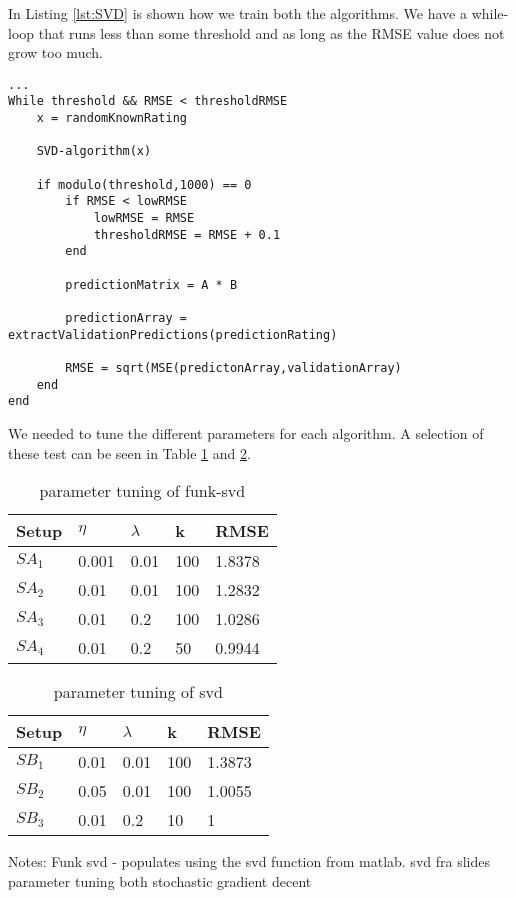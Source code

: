 In Listing \ref{lst:SVD} is shown how we train both the algorithms. We have a while-loop that runs less than some threshold and as long as the RMSE value does not grow too much.


\begin{lstlisting}[caption={Training of the prediction matrix},label=lst:SVD]
...
While threshold && RMSE < thresholdRMSE
	x = randomKnownRating
	
	SVD-algorithm(x)
	
	if modulo(threshold,1000) == 0
		if RMSE < lowRMSE 
			lowRMSE = RMSE 
			thresholdRMSE = RMSE + 0.1
		end
		
		predictionMatrix = A * B
		
		predictionArray = extractValidationPredictions(predictionRating)
		
		RMSE = sqrt(MSE(predictonArray,validationArray)	
	end
end
\end{lstlisting}

We needed to tune the different parameters for each algorithm. A selection of these test can be seen in Table \ref{fig:funk_tune} and \ref{fig:SVD_tune}.

\begin{table}[h]
\centering
\caption{parameter tuning of funk-svd}
\label{fig:funk_tune}
\begin{tabular}{|l|llll|}
\hline
Setup	& $\eta$ & $\lambda$ & k   & RMSE   \\ \hline
$SA_1$	& 0.001  & 0.01      & 100 & 1.8378 \\ \hline
$SA_2$	& 0.01   & 0.01      & 100 & 1.2832 \\ \hline
$SA_3$	& 0.01   & 0.2       & 100 & 1.0286 \\ \hline
$SA_4$	& 0.01   & 0.2		 & 50  & 0.9944 \\ \hline
\end{tabular}
\end{table}

\begin{table}[h]
\centering
\caption{parameter tuning of svd}
\label{fig:SVD_tune}
\begin{tabular}{|l|llll|}
\hline
Setup	& $\eta$ & $\lambda$ & k   & RMSE \\ \hline
$SB_1$	& 0.01   & 0.01   & 100 & 1.3873  \\ \hline
$SB_2$	& 0.05   & 0.01   & 100  & 1.0055 \\ \hline
$SB_3$	& 0.01   & 0.2    & 10 & 1		  \\ \hline
\end{tabular}
\end{table}



Notes: 
Funk svd - populates using the svd function from matlab.
svd fra slides
parameter tuning
both stochastic gradient decent


